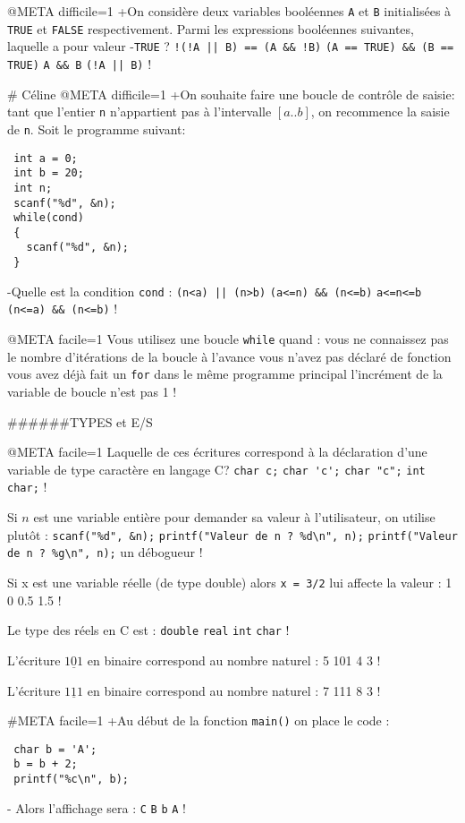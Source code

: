 @META difficile=1
+On considère deux variables booléennes \verb|A| et \verb|B|
initialisées à \verb|TRUE| et \verb|FALSE| respectivement. Parmi
les expressions booléennes suivantes, laquelle a pour valeur
-\verb|TRUE| ?
 \verb+!(!A || B) == (A && !B)+
 \verb|(A == TRUE) && (B == TRUE)|
 \verb|A && B|
 \verb+(!A || B)+
!

# Céline
@META difficile=1
+On souhaite faire une boucle de contrôle de saisie: tant que l'entier
\verb|n| n'appartient pas à l'intervalle $[a..b]$, on recommence la
saisie de \verb|n|. Soit le programme suivant:
 \begin{verbatim}
 int a = 0; 
 int b = 20;
 int n;
 scanf("%d", &n); 
 while(cond) 
 {
   scanf("%d", &n);
 }
\end{verbatim}
-Quelle est la condition \verb|cond| : 
 \verb+(n<a) || (n>b)+
 \verb|(a<=n) && (n<=b)|
 \verb|a<=n<=b|
\verb|(n<=a) && (n<=b)| 
!

@META facile=1
Vous utilisez une boucle \verb|while| quand :
 vous ne connaissez pas le nombre d'itérations de la boucle à l'avance
 vous n'avez pas déclaré de fonction
 vous avez déjà fait un  \verb|for| dans le même programme principal 
 l'incrément de la variable de boucle n'est pas 1
!


######TYPES et E/S

@META facile=1
Laquelle de ces écritures correspond à la déclaration d'une variable de type caractère en langage C?
 \verb|char c;|
 \verb|char 'c';|
 \verb|char "c";|
 \verb|int char;|
!


Si $n$ est une variable entière pour demander sa valeur à l'utilisateur, on utilise plutôt :
 \verb+scanf("%d", &n);+
 \verb+printf("Valeur de n ? %d\n", n);+
 \verb+printf("Valeur de n ? %g\n", n);+
  un débogueur
!

Si x est une variable réelle (de type double) alors \verb|x = 3/2| lui affecte la valeur :
  1
  0
  0.5
  1.5
!

Le type des réels en C est :
 \verb+double+
 \verb+real+
 \verb+int+
 \verb+char+
!

L'écriture $\underline{101}$ en binaire correspond au nombre naturel :
 5
 101
 4
 3
!


L'écriture $\underline{111}$ en binaire correspond au nombre naturel :
 7
 111
 8
 3
!


#META facile=1
+Au début de la fonction \verb|main()| on place le code :
 \begin{verbatim}
 char b = 'A';
 b = b + 2;
 printf("%c\n", b);
\end{verbatim}
- Alors l'affichage sera :
 \verb|C|
 \verb|B|
 \verb|b|
 \verb|A|
!


